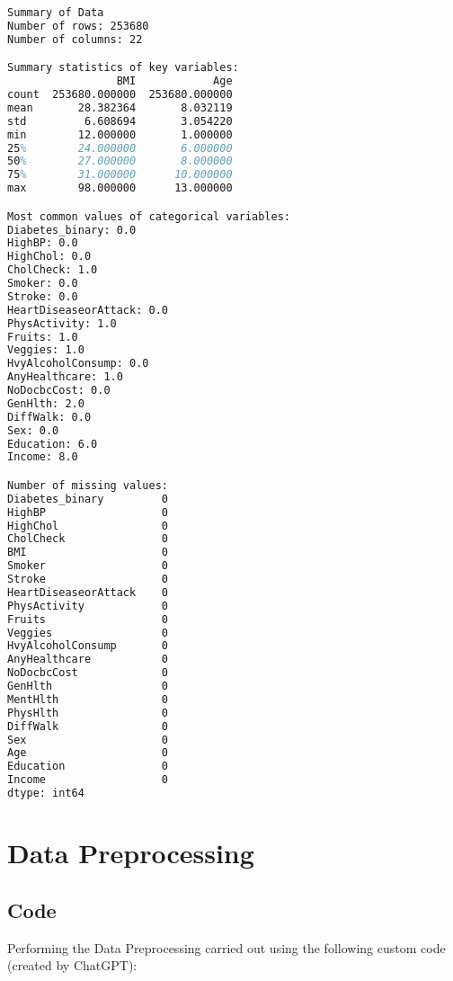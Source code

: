 \documentclass[12pt]{article}
\begin{document}
\begin{lstlisting}[language=TeX]
Summary of Data
Number of rows: 253680
Number of columns: 22

Summary statistics of key variables:
                 BMI            Age
count  253680.000000  253680.000000
mean       28.382364       8.032119
std         6.608694       3.054220
min        12.000000       1.000000
25%        24.000000       6.000000
50%        27.000000       8.000000
75%        31.000000      10.000000
max        98.000000      13.000000

Most common values of categorical variables:
Diabetes_binary: 0.0
HighBP: 0.0
HighChol: 0.0
CholCheck: 1.0
Smoker: 0.0
Stroke: 0.0
HeartDiseaseorAttack: 0.0
PhysActivity: 1.0
Fruits: 1.0
Veggies: 1.0
HvyAlcoholConsump: 0.0
AnyHealthcare: 1.0
NoDocbcCost: 0.0
GenHlth: 2.0
DiffWalk: 0.0
Sex: 0.0
Education: 6.0
Income: 8.0

Number of missing values:
Diabetes_binary         0
HighBP                  0
HighChol                0
CholCheck               0
BMI                     0
Smoker                  0
Stroke                  0
HeartDiseaseorAttack    0
PhysActivity            0
Fruits                  0
Veggies                 0
HvyAlcoholConsump       0
AnyHealthcare           0
NoDocbcCost             0
GenHlth                 0
MentHlth                0
PhysHlth                0
DiffWalk                0
Sex                     0
Age                     0
Education               0
Income                  0
dtype: int64

\end{lstlisting}

\section{Data Preprocessing} \subsection{Code}Performing the Data Preprocessing carried out using the following custom code (created by ChatGPT):
\end{document}
